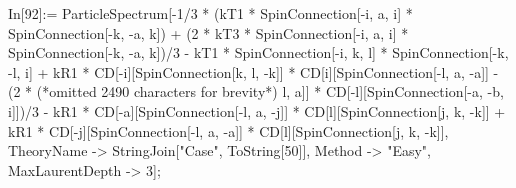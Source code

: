 In[92]:= ParticleSpectrum[-1/3 * (kT1 * SpinConnection[-i, a, i] * SpinConnection[-k, -a, k]) + (2 * kT3 * SpinConnection[-i, a, i] * SpinConnection[-k, -a, k])/3 - kT1 * SpinConnection[-i, k, l] * SpinConnection[-k, -l, i] + kR1 * CD[-i][SpinConnection[k, l, -k]] * CD[i][SpinConnection[-l, a, -a]] - (2 * (*omitted 2490 characters for brevity*) l, a]] * CD[-l][SpinConnection[-a, -b, i]])/3 - kR1 * CD[-a][SpinConnection[-l, a, -j]] * CD[l][SpinConnection[j, k, -k]] + kR1 * CD[-j][SpinConnection[-l, a, -a]] * CD[l][SpinConnection[j, k, -k]], TheoryName -> StringJoin["Case", ToString[50]], Method -> "Easy", MaxLaurentDepth -> 3];
